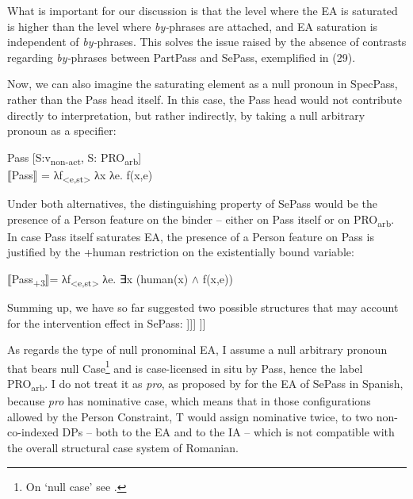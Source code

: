 \documentclass[output=paper]{langsci/langscibook}
\begin{document}
What is important for our discussion is that the level where the EA is saturated is higher than the level where \textit{by-}phrases are attached, and EA saturation is independent of \textit{by-}phrases. This solves the issue raised by the absence of contrasts regarding \textit{by-}phrases between PartPass and SePass, exemplified in (29). 

Now, we can also imagine the saturating element as a null pronoun in SpecPass, rather than the Pass head itself. In this case, the Pass head would not contribute directly to interpretation, but rather indirectly, by taking a null arbitrary pronoun as a specifier:

\ea%
    Pass [S:v\textsubscript{non-act}, S: PRO\textsubscript{arb}]\label{ex:giurgea:38}\\
  ⟦Pass⟧ = λf\textsubscript{<e,st>} λx λe. f(x,e)
\z
 
Under both alternatives, the distinguishing property of SePass would be the presence of a Person feature on the binder – either on Pass itself or on PRO\textsubscript{arb}. In case Pass itself saturates EA, the presence of a Person feature on Pass is justified by the +human restriction on the existentially bound variable:

\ea%
    \label{ex:giurgea:39}
⟦Pass\textsubscript{+3}⟧= λf\textsubscript{<e,st>} λe. ∃x (human(x) $\wedge$ f(x,e))
\z

Summing up, we have so far suggested two possible structures that may account for the intervention effect in SePass:
% 
\ea%
    \label{ex:giurgea:40}
    \ea\relax [\textsubscript{PassP} PRO-ARB\textsubscript{+Person} [Pass [\textit{\textsubscript{v}}\textsubscript{P} \textit{v} [\textsubscript{VP} V IA]]]]
    \ex\relax [\textsubscript{PassP} Pass\textsubscript{+Person} [\textit{\textsubscript{v}}\textsubscript{P} \textit{v} [\textsubscript{VP} V IA]]]
    \z
\z 

As regards the type of null pronominal EA, I assume a null arbitrary pronoun that bears null Case\footnote{On ‘null case’ see \citet{Chomsky1993,Bošković1995,Bošković1997,Martin2001}.}  and is case-licensed in situ by Pass, hence the label PRO\textsubscript{arb}. I do not treat it as \textit{pro}, as proposed by \citet{MacDonald2017} for the EA of SePass in Spanish, because \textit{pro} has nominative case, which means that in those configurations allowed by the Person Constraint, T would assign nominative twice, to two non-co-indexed DPs – both to the EA and to the IA – which is not compatible with the overall structural case system of Romanian.
\end{document}
